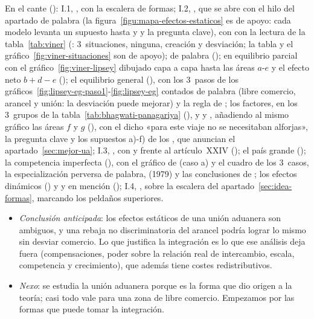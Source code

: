 \documentclass[11pt]{article}
\begin{document}
\begin{notaopositor}
En el cante (): I.1, , con la escalera de formas; I.2, , que se abre con el hilo del apartado de palabra (la figura~\ref{figu:mapa-efectos-estaticos} es de apoyo: cada modelo levanta un supuesto hasta  y  y la pregunta clave), con  con la lectura de la tabla~\ref{tab:viner} (: 3~situaciones, ninguna, creación y desviación; la tabla y el gráfico~\ref{fig:viner-situaciones} son de apoyo);  de palabra ();  en equilibrio parcial con el gráfico~\ref{fig:viner-lipsey} dibujado capa a capa hasta las áreas $a$-$e$ y el efecto neto $b+d-e$ (); el equilibrio general (), con los 3~pasos de los gráficos~\ref{fig:lipsey-eg-paso1}-\ref{fig:lipsey-eg} contados de palabra (libre comercio, arancel y unión: la desviación puede mejorar) y la regla de \textcite{Lipsey1960Customs}; los factores, en los 3~grupos de la tabla~\ref{tab:bhagwati-panagariya} (), y  y , añadiendo al mismo gráfico las áreas $f$ y $g$ (), con el dicho «para este viaje no se necesitaban alforjas», la pregunta clave y los supuestos a)-f) de los , que anuncian el apartado~\ref{sec:mejor-ua}; I.3, , con  y  frente al artículo~XXIV (); el país grande (); la competencia imperfecta (), con el gráfico de  (caso a) y el cuadro de los 3~casos, la especialización perversa de palabra,  (1979) y las conclusiones de ; los efectos dinámicos () y  y  en mención (); I.4, , sobre la escalera del apartado~\ref{sec:idea-formas}, marcando los peldaños superiores.
\end{notaopositor}

\begin{itemize}
\item \emph{Conclusión anticipada}: los efectos estáticos de una unión aduanera son ambiguos, y una rebaja no discriminatoria del arancel podría lograr lo mismo sin desviar comercio. Lo que justifica la integración es lo que ese análisis deja fuera (compensaciones, poder sobre la relación real de intercambio, escala, competencia y crecimiento), que además tiene costes redistributivos.
\item \emph{Nexo}: se estudia la unión aduanera porque es la forma que dio origen a la teoría; casi todo vale para una zona de libre comercio. Empezamos por las formas que puede tomar la integración.
\end{itemize}
\end{document}
